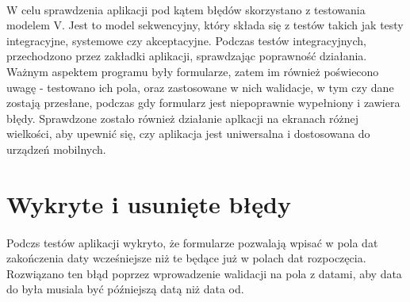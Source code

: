 \paragraph{}
W celu sprawdzenia aplikacji pod kątem błędów skorzystano z testowania modelem V. Jest to model sekwencyjny, który składa się z testów takich jak testy integracyjne, systemowe czy akceptacyjne. Podczas testów integracyjnych, przechodzono przez zakładki aplikacji, sprawdzając poprawność działania. Ważnym aspektem programu były formularze, zatem im również poświecono uwagę - testowano ich pola, oraz zastosowane w nich walidacje, w tym czy dane zostają przesłane, podczas gdy formularz jest niepoprawnie wypełniony i zawiera błędy. Sprawdzone zostało również działanie aplkacji na ekranach różnej wielkości, aby upewnić się, czy aplikacja jest uniwersalna i dostosowana do urządzeń mobilnych.

\section{Wykryte i usunięte błędy}
\paragraph{}
Podczs testów aplikacji wykryto, że formularze pozwalają wpisać w pola dat zakończenia daty wcześniejsze niż te będące już w polach dat rozpoczęcia. Rozwiązano ten błąd poprzez wprowadzenie walidacji na pola z datami, aby data do była musiala być późniejszą datą niż data od.

